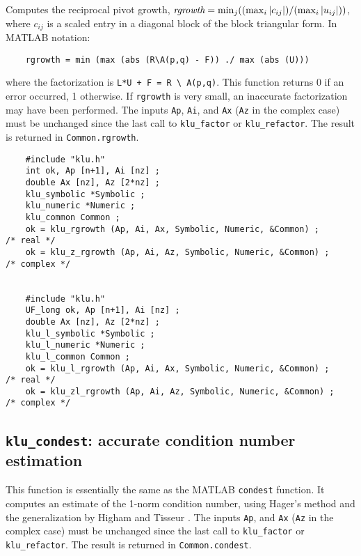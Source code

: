 \documentclass[11pt]{article}
\begin{document}
Computes the reciprocal pivot growth,
$\mbox{\em rgrowth} = \min_j (( \max_i |c_{ij}| ) / ( \max_i |u_{ij}| ))$,
where $c_{ij}$ is a scaled entry in a diagonal block of the block triangular
form.  In MATLAB notation:
\begin{verbatim}
    rgrowth = min (max (abs (R\A(p,q) - F)) ./ max (abs (U)))
\end{verbatim}
where the factorization is \verb'L*U + F = R \ A(p,q)'.
This function returns 0 if an error occurred, 1 otherwise.  If {\tt rgrowth} is
very small, an inaccurate factorization may have been performed.  The inputs
{\tt Ap}, {\tt Ai}, and {\tt Ax}  ({\tt Az} in the complex case) must be
unchanged since the last call to {\tt klu\_factor} or {\tt klu\_refactor}.  The
result is returned in {\tt Common.rgrowth}.

{\footnotesize
\begin{verbatim}
    #include "klu.h"
    int ok, Ap [n+1], Ai [nz] ;
    double Ax [nz], Az [2*nz] ;
    klu_symbolic *Symbolic ;
    klu_numeric *Numeric ;
    klu_common Common ;
    ok = klu_rgrowth (Ap, Ai, Ax, Symbolic, Numeric, &Common) ;                       /* real */
    ok = klu_z_rgrowth (Ap, Ai, Az, Symbolic, Numeric, &Common) ;                     /* complex */


    #include "klu.h"
    UF_long ok, Ap [n+1], Ai [nz] ;
    double Ax [nz], Az [2*nz] ;
    klu_l_symbolic *Symbolic ;
    klu_l_numeric *Numeric ;
    klu_l_common Common ;
    ok = klu_l_rgrowth (Ap, Ai, Ax, Symbolic, Numeric, &Common) ;                     /* real */
    ok = klu_zl_rgrowth (Ap, Ai, Az, Symbolic, Numeric, &Common) ;                    /* complex */
\end{verbatim}
}

\subsection{{\tt klu\_condest}: accurate condition number estimation}

This function is essentially the same as the MATLAB {\tt condest} function.  It
computes an estimate of the 1-norm condition number, using Hager's method
\cite{Hager84} and the generalization by Higham and Tisseur
\cite{HighamTisseur00}.  The inputs {\tt Ap}, and {\tt Ax} ({\tt Az} in the
complex case) must be unchanged since the last call to {\tt klu\_factor} or
{\tt klu\_refactor}.  The result is returned in {\tt Common.condest}.
\end{document}
